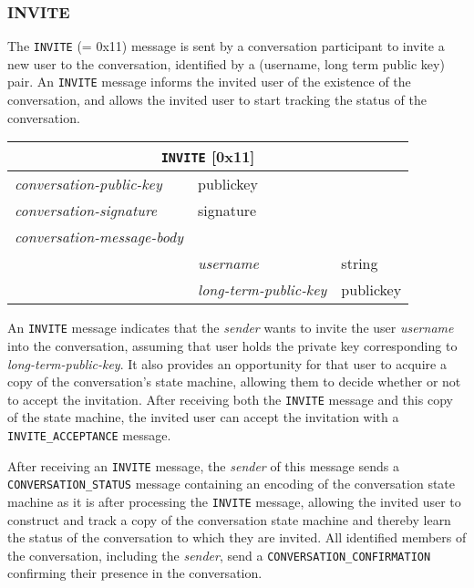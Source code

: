 \documentclass{article}
\def\npmessage#1{\texttt{#1}}
\def\field#1{\textit{#1}}
\def\type#1{\textsf{#1}}
\newenvironment{conversationmessage}[2]{
\newcommand{\messagefield}[2]{
& \field{##1} & \type{##2} \\
\hline
}
\hspace{2em minus 2em}\begin{tabular}{|l|l|l|}
\hline
\multicolumn{3}{|c|}{\npmessage{#1} [#2]} \\
\hline
\hline
\field{conversation-public-key} & \multicolumn{2}{l|}{\type{publickey}} \\
\hline
\field{conversation-signature} & \multicolumn{2}{l|}{\type{signature}} \\
\hline
\field{conversation-message-body} & \multicolumn{2}{l|}{} \\
\hline
}{
\end{tabular}
}
\begin{document}
\subsubsection{INVITE}
\label{sec:messages/invite}

The \npmessage{INVITE} (= 0x11) message is sent by a conversation participant to invite a new user to the conversation, identified by a (username, long term public key) pair.
An \npmessage{INVITE} message informs the invited user of the existence of the conversation, and allows the invited user to start tracking the status of the conversation.

\begin{conversationmessage}{INVITE}{0x11}
\messagefield{username}{string}
\messagefield{long-term-public-key}{publickey}
\end{conversationmessage}

An \npmessage{INVITE} message indicates that the \field{sender} wants to invite the user \field{username} into the conversation, assuming that user holds the private key corresponding to \field{long-term-public-key}.
It also provides an opportunity for that user to acquire a copy of the conversation's state machine, allowing them to decide whether or not to accept the invitation.
After receiving both the \npmessage{INVITE} message and this copy of the state machine, the invited user can accept the invitation with a \npmessage{INVITE\_ACCEPTANCE} message.

After receiving an \npmessage{INVITE} message, the \field{sender} of this message sends a \npmessage{CONVERSATION\_STATUS} message containing an encoding of the conversation state machine as it is after processing the \npmessage{INVITE} message, allowing the invited user to construct and track a copy of the conversation state machine and thereby learn the status of the conversation to which they are invited.
All identified members of the conversation, including the \field{sender}, send a \npmessage{CONVERSATION\_CONFIRMATION} confirming their presence in the conversation.
\end{document}
